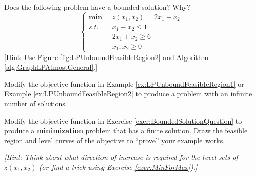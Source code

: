 \begin{exercise}{}{} Does the following problem have a bounded solution? Why?
\begin{equation}
\left\{
\begin{aligned}
\boldsymbol{\min}\;\;& z(x_1,x_2) = 2x_1 - x_2\\
s.t.\;\;& x_1 - x_2 \leq 1\\
& 2x_1 + x_2 \geq 6\\
&x_1,x_2 \geq 0
\end{aligned}
\right.
\end{equation}
[Hint: Use Figure \ref{fig:LPUnboundFeasibleRegion2} and Algorithm \ref{alg:GraphLPAlmostGeneral}.]
\label{exer:BoundedSolutionQuestion}
\end{exercise}

\begin{exercise}{}{} Modify the objective function in Example \ref{ex:LPUnboundFeasibleRegion1} or Example \ref{ex:LPUnboundFeasibleRegion2} to produce a problem with an infinite number of solutions. 
\end{exercise}

\begin{exercise}{}{} Modify the objective function in Exercise \ref{exer:BoundedSolutionQuestion} to produce a \textbf{minimization} problem that has a finite solution. Draw the feasible region and level curves of the objective to ``prove'' your example works. 

\emph{[Hint: Think about what direction of increase is required for the level sets of $z(x_1,x_2)$ (or find a trick using Exercise \ref{exer:MinForMax}).]}
\end{exercise}

